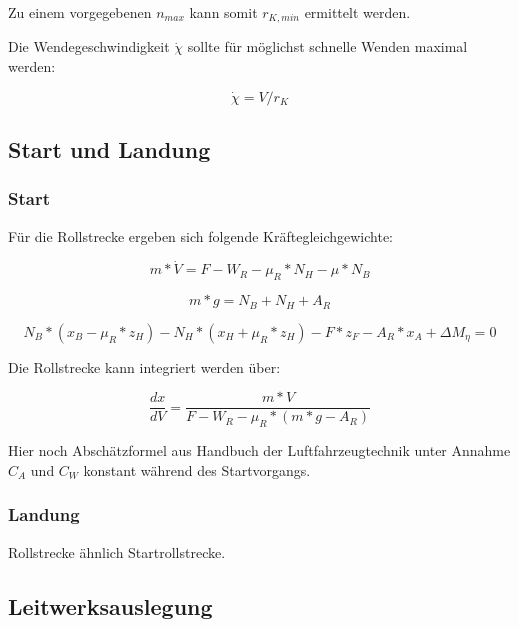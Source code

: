 Zu einem vorgegebenen $n_{max}$ kann somit $r_{K,min}$ ermittelt werden.

Die Wendegeschwindigkeit $\dot{\chi}$ sollte für möglichst schnelle Wenden maximal werden:

\begin{equation}
\dot{\chi} = V / r_K
\end{equation}


\subsection{Start und Landung}
\label{startlandung}

\subsubsection{Start}
\label{start}

Für die Rollstrecke ergeben sich folgende Kräftegleichgewichte:

\begin{equation}
m * \dot{V} = F - W_R - \mu_R * N_H - \mu * N_B
\end{equation}

\begin{equation}
m * g = N_B + N_H + A_R
\end{equation}

\begin{equation}
N_B * (x_B - \mu_R * z_H) - N_H * (x_H + \mu_R * z_H) - F * z_F - A_R * x_A + \Delta M_\eta = 0
\end{equation}

Die Rollstrecke kann integriert werden über:

\begin{equation}
\frac{dx}{dV} = \frac{m * V}{F - W_R - \mu_R * (m * g - A_R)}
\end{equation}

Hier noch Abschätzformel aus Handbuch der Luftfahrzeugtechnik unter Annahme $C_A$ und $C_W$ konstant während des Startvorgangs.

\subsubsection{Landung}
\label{landung}

Rollstrecke ähnlich Startrollstrecke.


\subsection{Leitwerksauslegung}
\label{leitwerk}

